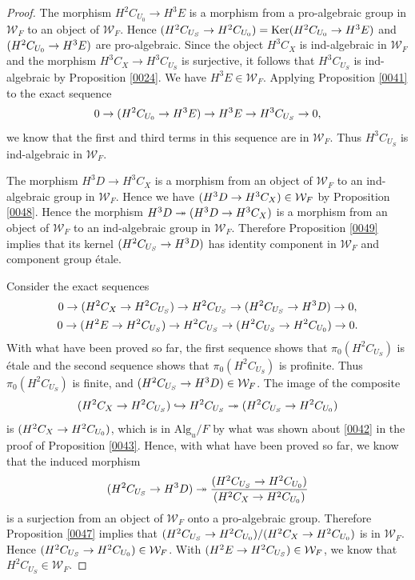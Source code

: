 \documentclass{amsart}
\theoremstyle{remark}
\numberwithin{equation}{section}
\newcommand{\into}{\hookrightarrow}
\newcommand{\onto}{\twoheadrightarrow}
\newcommand{\Alg}{\mathrm{Alg}}
\DeclareMathOperator{\Ker}{Ker}
\let\Im\relax
\DeclareMathOperator{\Im}{Im}
\begin{document}
\begin{proof}
	The morphism $H^{2} C_{U_{0}} \to H^{3} E$ is a morphism
	from a pro-algebraic group in $\mathcal{W}_{F}$ to an object of $\mathcal{W}_{F}$.
	Hence $\Im(H^{2} C_{U_{S}} \to H^{2} C_{U_{0}}) = \Ker(H^{2} C_{U_{0}} \to H^{3} E)$
	and $\Im(H^{2} C_{U_{0}} \to H^{3} E)$ are pro-algebraic.
	Since the object $H^{3} C_{X}$ is ind-algebraic in $\mathcal{W}_{F}$
	and the morphism $H^{3} C_{X} \to H^{3} C_{U_{S}}$ is surjective,
	it follows that $H^{3} C_{U_{S}}$ is ind-algebraic by Proposition \ref{0024}.
	We have $H^{3} E \in \mathcal{W}_{F}$.
	Applying Proposition \ref{0041} to the exact sequence
		\[
				0
			\to
				\Im(H^{2} C_{U_{0}} \to H^{3} E)
			\to
				H^{3} E
			\to
				H^{3} C_{U_{S}}
			\to
				0,
		\]
	we know that the first and third terms in this sequence are in $\mathcal{W}_{F}$.
	Thus $H^{3} C_{U_{S}}$ is ind-algebraic in $\mathcal{W}_{F}$.
	
	The morphism $H^{3} D \to H^{3} C_{X}$ is a morphism
	from an object of $\mathcal{W}_{F}$ to an ind-algebraic group in $\mathcal{W}_{F}$.
	Hence we have $\Im(H^{3} D \to H^{3} C_{X}) \in \mathcal{W}_{F}$
	by Proposition \ref{0048}.
	Hence the morphism $H^{3} D \onto \Im(H^{3} D \to H^{3} C_{X})$
	is a morphism from an object of $\mathcal{W}_{F}$
	to an ind-algebraic group in $\mathcal{W}_{F}$.
	Therefore Proposition \ref{0049} implies that
	its kernel $\Im(H^{2} C_{U_{S}} \to H^{3} D)$ has identity component in $\mathcal{W}_{F}$
	and component group \'etale.
	
	Consider the exact sequences
		\begin{gather*}
					0
				\to
					\Im(H^{2} C_{X} \to H^{2} C_{U_{S}})
				\to
					H^{2} C_{U_{S}}
				\to
					\Im(H^{2} C_{U_{S}} \to H^{3} D)
				\to
					0,
			\\
					0
				\to
					\Im(H^{2} E \to H^{2} C_{U_{S}})
				\to
					H^{2} C_{U_{S}}
				\to
					\Im(H^{2} C_{U_{S}} \to H^{2} C_{U_{0}})
				\to
					0.
		\end{gather*}
	With what have been proved so far,
	the first sequence shows that $\pi_{0}(H^{2} C_{U_{S}})$ is \'etale
	and the second sequence shows that $\pi_{0}(H^{2} C_{U_{S}})$ is profinite.
	Thus $\pi_{0}(H^{2} C_{U_{S}})$ is finite,
	and $\Im(H^{2} C_{U_{S}} \to H^{3} D) \in \mathcal{W}_{F}$.
	The image of the composite
		\[
				\Im(H^{2} C_{X} \to H^{2} C_{U_{S}})
			\into
				H^{2} C_{U_{S}}
			\onto
				\Im(H^{2} C_{U_{S}} \to H^{2} C_{U_{0}})
		\]
	is $\Im(H^{2} C_{X} \to H^{2} C_{U_{0}})$,
	which is in $\Alg_{u} / F$
	by what was shown about \eqref{0042} in the proof of Proposition \ref{0043}.
	Hence, with what have been proved so far, we know that the induced morphism
		\[
				\Im(H^{2} C_{U_{S}} \to H^{3} D)
			\onto
				\frac{
					\Im(H^{2} C_{U_{S}} \to H^{2} C_{U_{0}})
				}{
					\Im(H^{2} C_{X} \to H^{2} C_{U_{0}})
				}
		\]
	is a surjection from an object of $\mathcal{W}_{F}$
	onto a pro-algebraic group.
	Therefore Proposition \ref{0047} implies that
	$\Im(H^{2} C_{U_{S}} \to H^{2} C_{U_{0}}) / \Im(H^{2} C_{X} \to H^{2} C_{U_{0}})$
	is in $\mathcal{W}_{F}$.
	Hence $\Im(H^{2} C_{U_{S}} \to H^{2} C_{U_{0}}) \in \mathcal{W}_{F}$.
	With $\Im(H^{2} E \to H^{2} C_{U_{S}}) \in \mathcal{W}_{F}$,
	we know that $H^{2} C_{U_{S}} \in \mathcal{W}_{F}$.
\end{proof}
\end{document}
